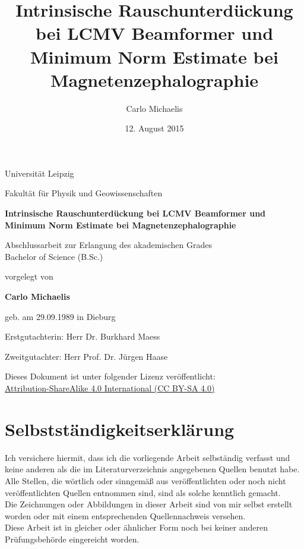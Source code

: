 \documentclass[doc,a4paper,12pt]{apa6}
\title{Intrinsische Rauschunterdückung bei LCMV Beamformer und Minimum Norm Estimate bei Magnetenzephalographie}
\author{Carlo Michaelis}
\date{12. August 2015}
\begin{document}

\thispagestyle{empty}

\begin{spacing}{1.1}
\begin{center}

\Large Universität Leipzig

\setlength{\parskip}{0.8em}
\normalsize Fakultät für Physik und Geowissenschaften

\setlength{\parskip}{6em}
\LARGE \textbf{Intrinsische Rauschunterdückung bei LCMV Beamformer und Minimum Norm Estimate bei Magnetenzephalographie}

\setlength{\parskip}{1.8em}
\normalsize Abschlussarbeit zur Erlangung des akademischen Grades\\ Bachelor of Science (B.Sc.)

\setlength{\parskip}{1.2em}
\normalsize vorgelegt von

\setlength{\parskip}{1.8em}
\Large \textbf{Carlo Michaelis}

\setlength{\parskip}{0.5em}
\normalsize geb. am 29.09.1989 in Dieburg

\setlength{\parskip}{3em}

Erstgutachterin: Herr Dr. Burkhard Maess

\setlength{\parskip}{0.3em}
Zweitgutachter: Herr Prof. Dr. Jürgen Haase

\vfill

Dieses Dokument ist unter folgender Lizenz veröffentlicht:\\ \href{http://creativecommons.org/licenses/by-sa/4.0/}{Attribution-ShareAlike 4.0 International (CC BY-SA 4.0)}

\end{center}
\end{spacing}
\newpage

\section*{Selbstständigkeitserklärung}

Ich versichere hiermit, dass ich die vorliegende Arbeit selbständig verfasst und keine
anderen als die im Literaturverzeichnis angegebenen Quellen benutzt habe.\\
Alle Stellen, die wörtlich oder sinngemäß aus veröffentlichten oder noch nicht veröffentlichten
Quellen entnommen sind, sind als solche kenntlich gemacht.\\
Die Zeichnungen oder Abbildungen in dieser Arbeit sind von mir selbst erstellt worden oder
mit einem entsprechenden Quellennachweis versehen.\\
Diese Arbeit ist in gleicher oder ähnlicher Form noch bei keiner anderen Prüfungsbehörde
eingereicht worden.
\end{document}
